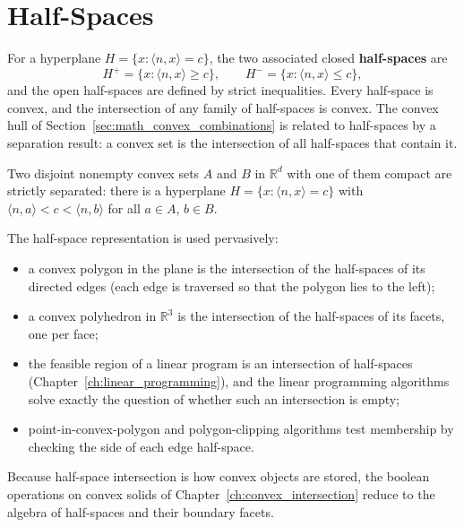 \section{Half-Spaces}
\label{sec:math_half_spaces}

For a hyperplane $H = \{x : \langle n,x\rangle = c\}$, the two associated
closed \textbf{half-spaces} are
\[
  H^+ = \{x : \langle n,x\rangle \ge c\},\qquad
  H^- = \{x : \langle n,x\rangle \le c\},
\]
and the open half-spaces are defined by strict inequalities. Every
half-space is convex, and the intersection of any family of half-spaces is
convex. The convex hull of Section~\ref{sec:math_convex_combinations} is
related to half-spaces by a separation result: a convex set is the
intersection of all half-spaces that contain it.

\begin{theorem}\label{thm:math_separation}
  Two disjoint nonempty convex sets $A$ and $B$ in $\mathbb{R}^d$ with one
  of them compact are strictly separated: there is a hyperplane
  $H = \{x : \langle n,x\rangle = c\}$ with $\langle n, a\rangle < c <
  \langle n, b\rangle$ for all $a\in A$, $b\in B$.
\end{theorem}

The half-space representation is used pervasively:
\begin{itemize}
  \item a convex polygon in the plane is the intersection of the
    half-spaces of its directed edges (each edge is traversed so that the
    polygon lies to the left);
  \item a convex polyhedron in $\mathbb{R}^3$ is the intersection of the
    half-spaces of its facets, one per face;
  \item the feasible region of a linear program is an intersection of
    half-spaces (Chapter~\ref{ch:linear_programming}), and the linear
    programming algorithms solve exactly the question of whether such an
    intersection is empty;
  \item point-in-convex-polygon and polygon-clipping algorithms test
    membership by checking the side of each edge half-space.
\end{itemize}

Because half-space intersection is how convex objects are stored, the
boolean operations on convex solids of Chapter~\ref{ch:convex_intersection}
reduce to the algebra of half-spaces and their boundary facets.


